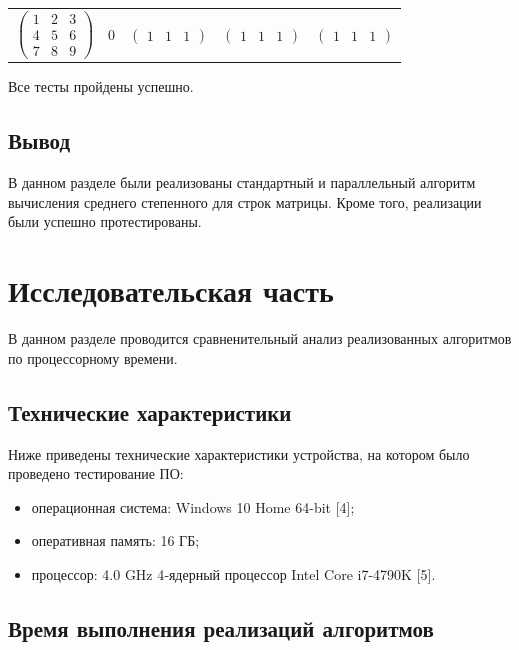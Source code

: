 \documentclass[12pt]{report}
\begin{document}
\begin{table}[H]
\begin{center}
\begin{tabular}{c c c c c}
			$\begin{pmatrix}
				1 & 2 & 3\\
				4 & 5 & 6\\
				7 & 8 & 9
			\end{pmatrix}$ &
			0 &
			$\begin{pmatrix}
				1 & 1 & 1
			\end{pmatrix}$ &
			$\begin{pmatrix}
				1 & 1 & 1
			\end{pmatrix}$ &
			$\begin{pmatrix}
				1 & 1 & 1
			\end{pmatrix}$ \\
		\end{tabular}
	\end{center}
\end{table}
Все тесты пройдены успешно.
\section{Вывод}

В данном разделе были реализованы стандартный и параллельный алгоритм вычисления среднего степенного для строк матрицы. Кроме того, реализации были успешно протестированы.

\newpage

\chapter{Исследовательская часть}

В данном разделе проводится сравненительный анализ реализованных алгоритмов по процессорному времени.

\section{Технические характеристики}

Ниже приведены технические характеристики устройства, на котором было проведено тестирование ПО:

\begin{itemize}
	\item операционная система: Windows 10 Home 64-bit [4];
	\item оперативная память: 16 ГБ;
	\item процессор: 4.0 GHz 4‑ядерный процессор Intel Core i7-4790K [5].

\end{itemize}

\section{Время выполнения реализаций алгоритмов}
\end{document}
